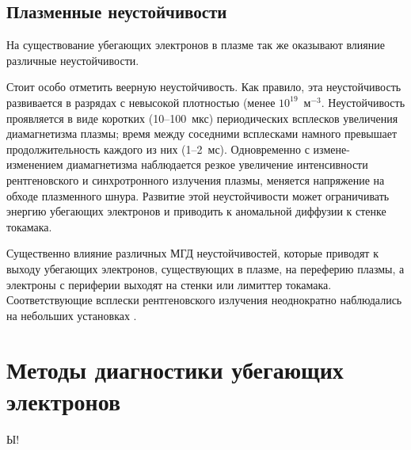 

\subsection{Плазменные неустойчивости}

На существование убегающих электронов в плазме так же оказывают влияние различные неустойчивости. 

Стоит особо отметить веерную неустойчивость. Как правило, эта неустойчивость развивается в разрядах с невысокой плотностью (менее $10^{19}$~м${}^{-3}$. Неустойчивость проявляется в виде коротких (10--100~мкс) периодических всплесков увеличения диамагнетизма плазмы; время между соседними всплесками намного превышает продолжительность каждого из них (1--2~мс).  Одновременно с измене- изменением диамагнетизма наблюдается резкое увеличение интенсивности рентгеновского и синхротронного излучения плазмы, меняется напряжение на обходе плазменного шнура. Развитие этой неустойчивости может ограничивать энергию убегающих электронов и приводить к аномальной диффузии к стенке токамака. \cite{Parail1978,Leontovich1982}

Существенно влияние различных МГД неустойчивостей, которые приводят к выходу убегающих электронов, существующих в плазме, на переферию плазмы, а электроны с периферии выходят на стенки или лимиттер токамака. Соответствующие всплески рентгеновского излучения неоднократно наблюдались на небольших установках \cite{Shevelev2016,Shevelev2018}. 



\section{Методы диагностики убегающих электронов}\label{sec:ch1/sec2}

Ы!


\FloatBarrier
